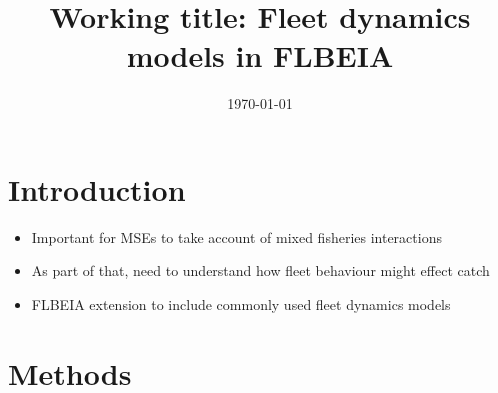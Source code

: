 \documentclass[12pt, halfline, a4paper]{ouparticle}
\begin{document}
\title{Working title: Fleet dynamics models in FLBEIA}

\author{
	\address{GMIT}
	\address{CEFAS}
	\and
	\address{GMIT}
	\and
	\address{AZTI}
}


\date{\today}


\maketitle

\section{Introduction}
\label{intro}

\begin{itemize}

	\item Important for MSEs to take account of mixed fisheries
		interactions
	\item As part of that, need to understand how fleet behaviour might
		effect catch
	\item FLBEIA extension to include commonly used fleet dynamics models	

\end{itemize}

\section{Methods}
\label{meth}
\end{document}
